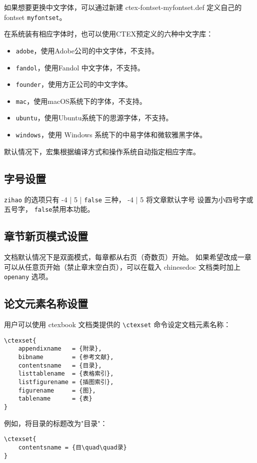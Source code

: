 如果想要更换中文字体，可以通过新建 ctex-fontset-myfontset.def 定义自己的 fontset \verb|myfontset|。

在系统装有相应字体时，也可以使用CTEX预定义的六种中文字库：
\begin{itemize}
    \item \verb|adobe|，使用Adobe公司的中文字体，不支持。
    \item \verb|fandol|，使用Fandol 中文字体，不支持。
    \item \verb|founder|，使用方正公司的中文字体。
    \item \verb|mac|，使用macOS系统下的字体，不支持。
    \item \verb|ubuntu|，使用Ubuntu系统下的思源字体，不支持。
    \item \verb|windows|，使用 Windows 系统下的中易字体和微软雅黑字体。
\end{itemize}
默认情况下，\CTeX{}宏集根据编译方式和操作系统自动指定相应字库。

\subsection{字号设置}

\texttt{zihao} 的选项只有 -4 | 5 | \texttt{false} 三种，
-4 | 5 将文章默认字号 \texttt{\bfseries\string\normalsize}设置为小四号字或五号字，
\texttt{false}禁用本功能。

\subsection{章节新页模式设置}
文档默认情况下是双面模式，每章都从右页（奇数页）开始。
如果希望改成一章可以从任意页开始（禁止章末空白页），可以在载入 chinesedoc 文档类时加上 \texttt{openany} 选项。

\subsection{论文元素名称设置}
用户可以使用 ctexbook 文档类提供的 \verb|\ctexset| 命令设定文档元素名称：
\begin{Verbatim}
\ctexset{
    appendixname   = {附录},
    bibname        = {参考文献},
    contentsname   = {目录},
    listtablename  = {表格索引},
    listfigurename = {插图索引},
    figurename     = {图},
    tablename      = {表}
}
\end{Verbatim}
例如，将目录的标题改为"目{\quad\quad}录"：
\begin{Verbatim}
\ctexset{
    contentsname = {目\quad\quad录}
}
\end{Verbatim}

